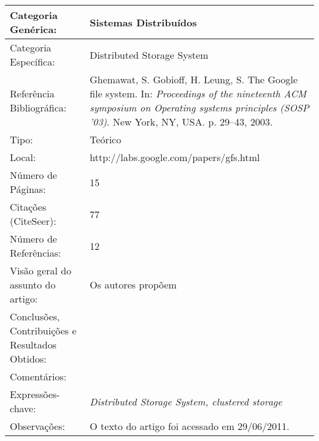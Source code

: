 \documentclass[10pt,a4paper]{article}
\begin{document}
\begin{center}
\begin{tabular}{|p{5cm}||p{10cm}|}
\hline

Categoria Genérica: & Sistemas Distribuídos\\\hline
Categoria Específica: & Distributed Storage System\\\hline
Referência Bibliográfica: & Ghemawat, S. Gobioff, H. Leung, S. The Google file system. In:  \emph{Proceedings of the nineteenth ACM symposium on Operating systems principles (SOSP '03)}. New York, NY, USA. p. 29--43, 2003.\\\hline
Tipo: & Teórico\\\hline
Local: & http://labs.google.com/papers/gfs.html\\\hline
Número de Páginas: & 15\\\hline
Citações (CiteSeer): & 77\\\hline
Número de Referências: & 12\\\hline
Visão geral do assunto do artigo: & Os autores propõem \\\hline
Conclusões, Contribuições e Resultados Obtidos: &  \\\hline
Comentários: & \\\hline
Expressões-chave: & \emph{Distributed Storage System, clustered storage}\\\hline
Observações: & O texto do artigo foi acessado em 29/06/2011.\\\hline

\end{tabular}
\end{center}
\end{document}

